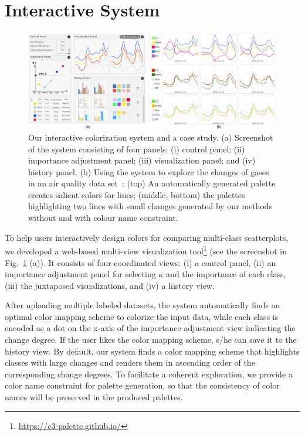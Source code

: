 \section{Interactive System}


\begin{figure}[ht]
\centering
\includegraphics[width=1.0\columnwidth]{figures/interface.pdf}
\caption{Our interactive colorization system and a case study. (a) Screenshot of the system consisting of four panels: (i) control panel; (ii) importance adjustment panel; (iii) visualization panel; and (iv) history panel. (b) Using the system to explore the changes of gases in an air quality data set~\cite{DEVITO2008750}: (top) An automatically generated palette creates salient colors for lines; (middle, bottom) the palettes highlighting two lines with small changes generated by our methods without and with colour name constraint.}
\vspace*{-3mm}
\label{fig:ui-case}
\end{figure}

\label{sec:interaction}
To help users interactively design colors for comparing multi-class scatterplots, we developed a web-based multi-view visualization tool\footnote{\small \url{https://c3-palette.github.io/}}
(see the screenshot in Fig.~\ref{fig:ui-case} (a)).
It consists of four coordinated views: (i) a control panel, (ii) an importance adjustment panel for selecting $\kappa$ and  the importance of each class, (iii) the juxtaposed visualizations, and (iv) a history view.

After uploading multiple labeled datasets, the system automatically finds an optimal color mapping scheme to colorize the input data, while each class is encoded as a dot on the x-axis of the importance adjustment view indicating the change degree. If the user likes the color mapping scheme, s/he can save it to the history view. By default, our system finds a color mapping scheme that highlights classes with large changes and renders them in ascending order of the corresponding change degrees.
To facilitate a coherent exploration, we provide a color name constraint for palette generation, so that the consistency of color names will be preserved in the produced palettes.










